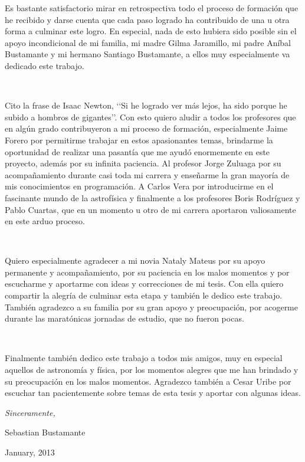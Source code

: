 \begin{acknowledgements}      

Es bastante satisfactorio mirar en retrospectiva todo el proceso de 
formación que he recibido y darse cuenta que cada paso logrado ha contribuido 
de una u otra forma a culminar este logro. En especial, nada de esto hubiera 
sido posible sin el apoyo incondicional de mi familia, mi madre Gilma 
Jaramillo, mi padre Aníbal Bustamante y mi hermano Santiago Bustamante, a 
ellos muy especialmente va dedicado este trabajo.

\

Cito la frase de Isaac Newton, ‘‘Si he logrado ver más lejos, ha sido 
porque he subido a hombros de gigantes’’. Con esto quiero aludir a todos los 
profesores que en algún grado contribuyeron a mi proceso de formación,
especialmente Jaime Forero por permitirme trabajar en estos apasionantes temas,
brindarme la oportunidad de realizar una pasantía que me ayudó enormemente
en este proyecto, además por su infinita paciencia. Al profesor Jorge Zuluaga 
por su acompañamiento durante casi toda mi carrera y enseñarme la gran mayoría
de mis conocimientos en programación. A Carlos Vera por introducirme en el 
fascinante mundo de la astrofísica y finalmente a los profesores Boris
Rodríguez y Pablo Cuartas, que en un momento u otro de mi carrera aportaron 
valiosamente en este arduo proceso.

\

Quiero especialmente agradecer a mi novia Nataly Mateus por su apoyo 
permanente y acompañamiento, por su paciencia en los malos momentos y por 
escucharme y aportarme con ideas y correcciones de mi tesis. Con ella quiero 
compartir la alegría de culminar esta etapa y también le dedico este trabajo. 
También agradezco a su familia por su gran apoyo y preocupación, por acogerme 
durante las maratónicas jornadas de estudio, que no fueron pocas.

\

Finalmente también dedico este trabajo a todos mis amigos, muy en especial 
aquellos de astronomía y física, por los momentos alegres que me han brindado
y su preocupación en los malos momentos. Agradezco también a Cesar Uribe 
por escuchar tan pacientemente sobre temas de esta tesis y aportar 
con algunas ideas.


\begin{flushright}
\textit{Sinceramente,}


Sebastian Bustamante


January, 2013
\end{flushright}


\end{acknowledgements}


